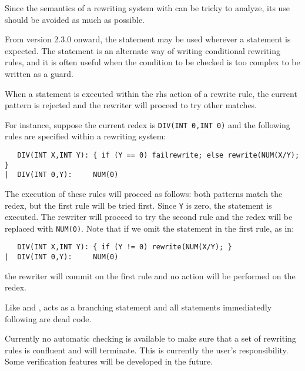 \begin{Tips}
Since the semantics of a rewriting system with  can
be tricky to analyze, its use should be avoided as much as possible. 
\end{Tips}


   From version 2.3.0 onward, the 
statement may be used wherever a  statement is expected.
The  statement is an alternate way of writing
conditional rewriting rules, and it is often useful when the condition
to be checked is too complex to be written as a guard.

When a  statement is executed within the rhs action of a
rewrite rule, the current pattern is rejected and the rewriter
will proceed to try other matches.   

For instance, suppose the current redex is 
\verb|DIV(INT 0,INT 0)| and the following rules are specified within
a rewriting system:
\begin{verbatim}
   DIV(INT X,INT Y): { if (Y == 0) failrewrite; else rewrite(NUM(X/Y); }
|  DIV(INT 0,Y):     NUM(0)
\end{verbatim} 

The execution of these rules will proceed as follows:  both patterns
match the redex, but the first rule will be tried first.  Since
\verb|Y| is zero, the  statement is executed.  The rewriter
will proceed to try the
second rule and the redex will be replaced with \verb|NUM(0)|. 
Note that if we omit the  statement
in the first rule, as in:
\begin{verbatim}
   DIV(INT X,INT Y): { if (Y != 0) rewrite(NUM(X/Y); }
|  DIV(INT 0,Y):     NUM(0)
\end{verbatim}
the rewriter will commit on the first rule
and no action will be performed on the redex.

Like  and , 
acts as a branching statement and all statements
immediatedly following  are dead code.


   Currently no automatic checking is available to make sure that
a set of rewriting rules is confluent and will terminate.  This is currently
the user's responsibility.  Some verification features will be developed
in the future.


